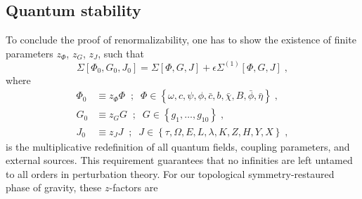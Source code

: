 \documentclass[../main.tex]{subfiles}
\begin{document}
\subsection{Quantum stability}\label{sec:stability;sec:quantum}

To conclude the proof of renormalizability, one has to show the existence of finite parameters $ z_{ \Phi } $, $ z_{ G } $, $ z_{ J } $, such that
\begin{equation}
  \label{eq:multiplicative-renorm}
  \Sigma \left[ \Phi_0, G_0, J_0 \right] = \Sigma \left[ \Phi, G, J \right] + \epsilon\Sigma^{ (1) } \left[ \Phi, G, J \right] \;,
\end{equation}
where
\begin{subequations}%
  \label{eq:field-redef}
  \begin{align}
    \Phi_0 & \equiv z_{ \Phi } \Phi \;\; ; \;\; \Phi \in \left\{ \omega, c, \psi, \phi, \bar{ c }, b, \bar{ \chi }, B, \bar{ \phi }, \bar{ \eta } \right\} \;, \\
    G_0    & \equiv z_{ G } G \;\; ; \;\; G \in \left\{ g_1, \ldots, g_{10} \right\} \;,                                                                       \\
    J_0    & \equiv z_{ J } J \;\; ; \;\; J \in \left\{ \tau, \Omega, E, L, \lambda, K, Z, H, Y, X \right\} \;,
  \end{align}
\end{subequations}
is the multiplicative redefinition of all quantum fields, coupling parameters, and external sources. This requirement guarantees that no infinities are left untamed to all orders in perturbation theory. For our topological symmetry-restaured phase of gravity, these $z$-factors are
\end{document}
